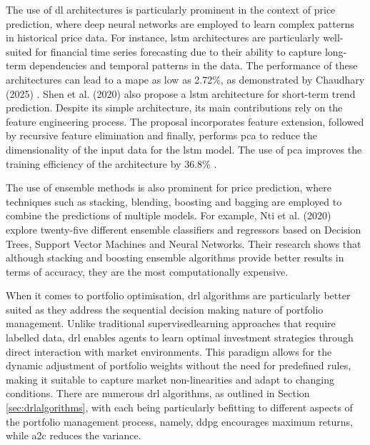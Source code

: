The use of \acrlong{dl} architectures is particularly prominent in the context of price prediction, where deep neural networks are employed to learn complex patterns in historical price data. For instance, \acrfull{lstm} architectures are particularly well-suited for financial time series forecasting due to their ability to capture long-term dependencies and temporal patterns in the data. The performance of these architectures can lead to a \acrfull{mape} as low as 2.72\%, as demonstrated by Chaudhary (2025) \cite{Chaudhary2025}. Shen et al. (2020) \cite{Shen2020} also propose a \acrshort{lstm} architecture for short-term trend prediction. Despite its simple architecture, its main contributions rely on the feature engineering process. The proposal incorporates feature extension, followed by recursive feature elimination and finally, performs \acrfull{pca} to reduce the dimensionality of the input data for the \acrshort{lstm} model. The use of \acrshort{pca} improves the training efficiency of the architecture by 36.8\% \cite{Shen2020}. 

The use of ensemble methods is also prominent for price prediction, where techniques such as stacking, blending, boosting and bagging are employed to combine the predictions of multiple models. For example, Nti et al. (2020) \cite{Nti2020} explore twenty-five different ensemble classifiers and regressors based on Decision Trees, Support Vector Machines and Neural Networks. Their research shows that although stacking and boosting ensemble algorithms provide better results in terms of accuracy, they are the most computationally expensive. 

When it comes to portfolio optimisation, \acrshort{drl} algorithms are particularly better suited as they address the sequential decision making nature of portfolio management. Unlike traditional \Gls{supervisedlearning} approaches that require labelled data, \acrshort{drl} enables agents to learn optimal investment strategies through direct interaction with market environments. This paradigm allows for the dynamic adjustment of portfolio weights without the need for predefined rules, making it suitable to capture market non-linearities and adapt to changing conditions. There are numerous \acrshort{drl} algorithms, as outlined in Section \ref{sec:drlalgorithms}, with each being particularly befitting to different aspects of the portfolio management process, namely, \acrshort{ddpg} encourages maximum returns, while \acrshort{a2c} reduces the variance. 

